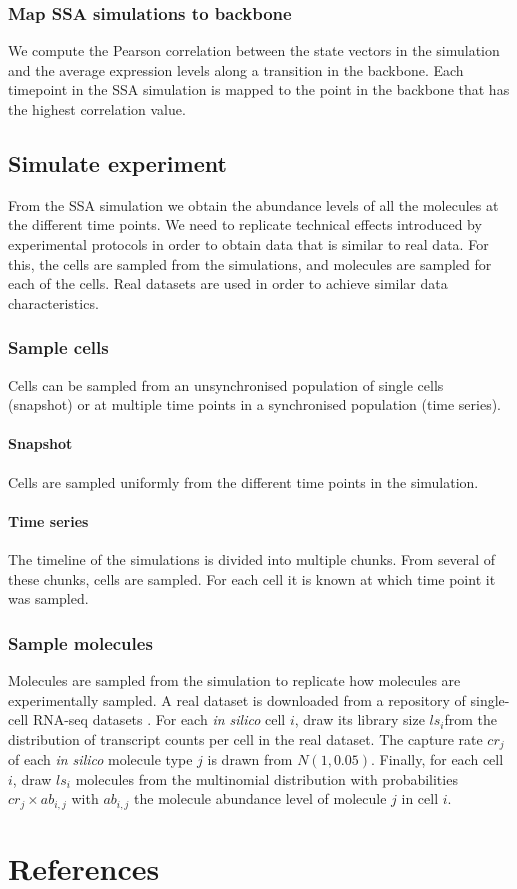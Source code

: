 \subsubsection{Map SSA simulations to backbone}
We compute the Pearson correlation between the state vectors in the simulation and the average expression levels along a transition in the backbone. Each timepoint in the SSA simulation is mapped to the point in the backbone that has the highest correlation value.

\subsection{Simulate experiment}
From the SSA simulation we obtain the abundance levels of all the molecules at the different time points. We need to replicate technical effects introduced by experimental protocols in order to obtain data that is similar to real data. For this, the cells are sampled from the simulations, and molecules are sampled for each of the cells. Real datasets are used in order to achieve similar data characteristics.

\subsubsection{Sample cells}
Cells can be sampled from an unsynchronised population of single cells (snapshot) or at multiple time points in a synchronised population (time series).

\paragraph{Snapshot} Cells are sampled uniformly from the different time points in the simulation.

\paragraph{Time series} The timeline of the simulations is divided into multiple chunks. From several of these chunks, cells are sampled. For each cell it is known at which time point it was sampled.

\subsubsection{Sample molecules} 
Molecules are sampled from the simulation to replicate how molecules are experimentally sampled. A real dataset is downloaded from a repository of single-cell RNA-seq datasets \cite{cannoodt_singlecellomicsdatasets_2018}. For each \textit{in silico} cell $i$, draw its library size $ls_i$from the distribution of transcript counts per cell in the real dataset. The capture rate $cr_j$ of each \textit{in silico} molecule type $j$ is drawn from $N(1, 0.05)$. Finally, for each cell $i$, draw $ls_i$ molecules from the multinomial distribution with probabilities $cr_j \times ab_{i,j}$ with $ab_{i,j}$ the molecule abundance level of molecule $j$ in cell $i$.


\clearpage
\section{References}
\printbibliography[heading=none]
